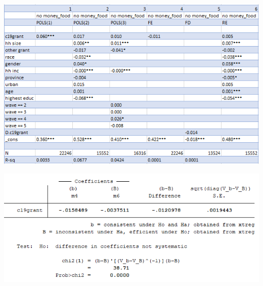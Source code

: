 \documentclass[11pt,preprint, authoryear]{elsarticle}
\let\origfigure\figure
\let\endorigfigure\endfigure
\renewenvironment{figure}[1][2] {
    \expandafter\origfigure\expandafter[H]
} {
    \endorigfigure
}
\numberwithin{equation}{section}
\numberwithin{figure}{section}
\numberwithin{table}{section}
\begin{document}
\begin{figure}[H]
\includegraphics[width=1\linewidth]{figures/nomoney_table} \caption{\label{results_money} Table of Results - No Money For Food (Own Calculations, Data: NIDS-CRAM)}\label{fig:results_money}
\end{figure}

\begin{figure}[H]
\includegraphics[width=1\linewidth]{figures/hausman1} \caption{\label{hausman} Hausman Test (Own Calculations, Data: NIDS-CRAM)}\label{fig:hausman}
\end{figure}


\end{document}
